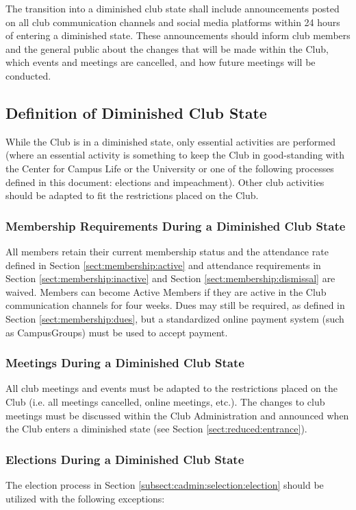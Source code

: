 \documentclass[english,11pt]{article}
\begin{document}
The transition into a diminished club state shall include announcements posted on all club communication channels and social media platforms within 24 hours of entering a diminished state.
These announcements should inform club members and the general public about the changes that will be made within the Club, which events and meetings are cancelled, and how future meetings will be conducted.

\subsection{Definition of Diminished Club State} \label{sect:reduced:definition}
While the Club is in a diminished state, only essential activities are performed (where an essential activity is something to keep the Club in good-standing with the Center for Campus Life or the University or one of the following processes defined in this document: elections and impeachment).
Other club activities should be adapted to fit the restrictions placed on the Club.

\subsubsection{Membership Requirements During a Diminished Club State} \label{subsect:reduced:membership}
All members retain their current membership status and the attendance rate defined in Section \ref{sect:membership:active} and attendance requirements in Section \ref{sect:membership:inactive} and Section \ref{sect:membership:dismissal} are waived.
Members can become Active Members if they are active in the Club communication channels for four weeks.
Dues may still be required, as defined in Section \ref{sect:membership:dues}, but a standardized online payment system (such as CampusGroups) must be used to accept payment.

\subsubsection{Meetings During a Diminished Club State} \label{subsect:reduced:meetings}
All club meetings and events must be adapted to the restrictions placed on the Club (i.e. all meetings cancelled, online meetings, etc.).
The changes to club meetings must be discussed within the Club Administration and announced when the Club enters a diminished state (see Section \ref{sect:reduced:entrance}).

\subsubsection{Elections During a Diminished Club State} \label{subsect:reduced:cadmin}
The election process in Section \ref{subsect:cadmin:selection:election} should be utilized with the following exceptions:
\end{document}
